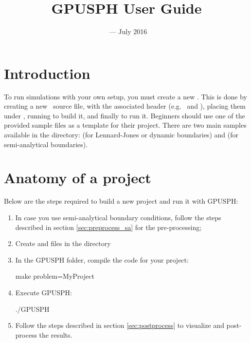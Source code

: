 \documentclass{../GPUSPHtemplate}
\title{GPUSPH User Guide}
\author{}
\date{\currentver\ --- July 2016}
\begin{document}
\maketitle
\tableofcontents
\newpage
\section{Introduction}

To run simulations with your own setup, you must create a new
. This is done by creating a new \cpp\ source file, with
the associated header (e.g.\  and ),
placing them under , running  to
build it, and finally  to run it. Beginners should use one
of the provided sample files as a template for their project.
There are two main samples available in the  directory: 
 (for Lennard-Jones or dynamic boundaries) 
and  (for semi-analytical boundaries).\\

%
%

\section{Anatomy of a project}

Below are the steps required to build a new project and run it with GPUSPH:
\begin{enumerate}
\item In case you use semi-analytical boundary conditions, follow the steps 
described in section \ref{sec:preprocess_sa} for the pre-processing;
\item Create  and  files in 
the  directory
\item In the GPUSPH folder, compile the code for your project:
\begin{shellcode}
make problem=MyProject
\end{shellcode}
\item Execute GPUSPH:
\begin{shellcode}
./GPUSPH
\end{shellcode}
\item Follow the steps described in section \ref{sec:postprocess} 
to visualize and post-process the results.
\end{enumerate}
\end{document}
